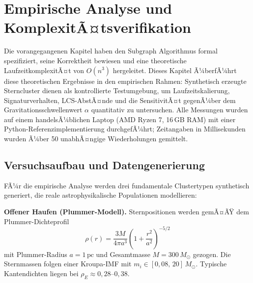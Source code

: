 ﻿\documentclass[a4paper,12pt]{report}
\theoremstyle{definition}
\begin{document}
\chapter{Empirische Analyse und KomplexitÃ¤tsverifikation}
\label{chap:empirie}

Die vorangegangenen Kapitel haben den Subgraph Algorithmus formal spezifiziert, seine Korrektheit bewiesen und eine theoretische LaufzeitkomplexitÃ¤t von $O(n^3)$ hergeleitet. Dieses Kapitel Ã¼berfÃ¼hrt diese theoretischen Ergebnisse in den empirischen Rahmen: Synthetisch erzeugte Sterncluster dienen als kontrollierte Testumgebung, um Laufzeitskalierung, Signaturverhalten, LCS-AbstÃ¤nde und die SensitivitÃ¤t gegenÃ¼ber dem Gravitationsschwellenwert $\alpha$ quantitativ zu untersuchen. Alle Messungen wurden auf einem handelsÃ¼blichen Laptop (AMD Ryzen 7, 16\,GB RAM) mit einer Python-Referenzimplementierung durchgefÃ¼hrt; Zeitangaben in Millisekunden wurden Ã¼ber 50 unabhÃ¤ngige Wiederholungen gemittelt.

\section{Versuchsaufbau und Datengenerierung}
\label{sec:empirie_aufbau}

FÃ¼r die empirische Analyse werden drei fundamentale Clustertypen synthetisch generiert, die reale astrophysikalische Populationen modellieren:

\textbf{Offener Haufen (Plummer-Modell).} Sternpositionen werden gemÃ¤ÃŸ dem Plummer-Dichteprofil
\[
    \rho(r) = \frac{3M}{4\pi a^3}\left(1 + \frac{r^2}{a^2}\right)^{-5/2}
\]
mit Plummer-Radius $a = 1\,\mathrm{pc}$ und Gesamtmasse $M = 300\,M_\odot$ gezogen. Die Sternmassen folgen einer Kroupa-IMF mit $m_i \in [0{,}08,\,20]\,M_\odot$. Typische Kantendichten liegen bei $\rho_E \approx 0{,}28$--$0{,}38$.
\end{document}
